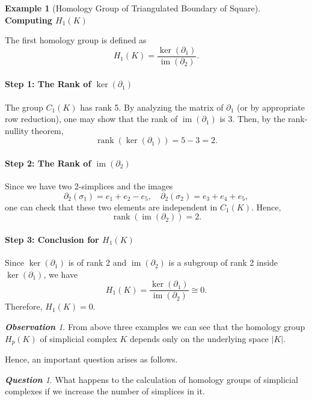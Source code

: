\documentclass[12pt,oneside,reqno]{amsart}
\theoremstyle{plain}
\theoremstyle{definition}
\newtheorem{example}{Example}[section]
\theoremstyle{remark}
\newtheorem{question}[]{\textbf{Question}}
\newtheorem{observation}[]{\textbf{Observation}}
\newcommand{\0}{{\textbf{0}}}
\begin{document}
\begin{example}[Homology Group of Triangulated Boundary of Square]
\textbf{Computing \(H_1(K)\)}

The first homology group is defined as
\[
H_1(K) = \frac{\ker(\partial_1)}{\operatorname{im}(\partial_2)}.
\]

\paragraph{Step 1: The Rank of \(\ker(\partial_1)\)}
The group \(C_1(K)\) has rank 5. By analyzing the matrix of \(\partial_1\) (or by appropriate row reduction), one may show that the rank of \(\operatorname{im}(\partial_1)\) is 3. Then, by the rank-nullity theorem,
\[
\operatorname{rank}(\ker(\partial_1)) = 5 - 3 = 2.
\]

\paragraph{Step 2: The Rank of \(\operatorname{im}(\partial_2)\)}
Since we have two 2-simplices and the images
\[
\partial_2(\sigma_1) = e_1 + e_2 - e_5, \quad \partial_2(\sigma_2) = e_3 + e_4 + e_5,
\]
one can check that these two elements are independent in \(C_1(K)\). Hence, 
\[
\operatorname{rank}(\operatorname{im}(\partial_2)) = 2.
\]

\paragraph{Step 3: Conclusion for \(H_1(K)\)}
Since \(\ker(\partial_1)\) is of rank 2 and \(\operatorname{im}(\partial_2)\) is a subgroup of rank 2 inside \(\ker(\partial_1)\), we have
\[
H_1(K) = \frac{\ker(\partial_1)}{\operatorname{im}(\partial_2)} \cong 0.
\]
Therefore, $H_1(K) = 0$.
\end{example}

\begin{observation}
From above three examples we can see that the homology group $H_{p}(K)$ of simplicial complex $K$ depends only on the underlying space $|K|$.  
\end{observation}
Hence, an important question arises as follows.  
\begin{question}
What happens to the calculation of homology groups of simplicial complexes if we increase the number of simplices in it.  
\end{question}
\end{document}
